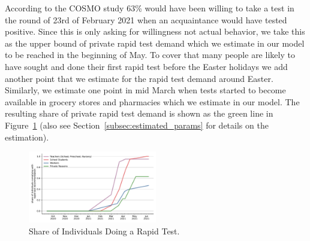 According to the COSMO study \citep{Betsch2021a} 63\% would have been willing to take a
test in the round of 23rd of February 2021 when an acquaintance would have tested
positive. Since this is only asking for willingness not actual behavior, we take this as
the upper bound of private rapid test demand which we estimate in our model to be reached
in the beginning of May. To cover that many people are likely to have sought and done
their first rapid test before the Easter holidays we add another point that we estimate
for the rapid test demand around Easter. Similarly, we estimate one point in mid March
when tests started to become available in grocery stores and pharmacies which we estimate
in our model. The resulting share of private rapid test demand is shown as the green line
in Figure~\ref{fig:rapid_test_demand} (also see Section~\ref{subsec:estimated_params} for
details on the estimation).


\begin{figure}
    \centering
    \includegraphics[width=0.5\textwidth]{figures/results/figures/data/testing/rapid_test_demand/baseline_shares}
    \caption{Share of Individuals Doing a Rapid Test.}
    \label{fig:rapid_test_demand}
\end{figure}

\FloatBarrier